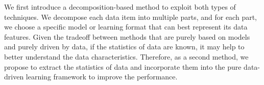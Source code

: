  
 



We first introduce a decomposition-based method to exploit both types of techniques.  We decompose each data item into multiple parts, and for each part, we choose a specific model or learning format that can best represent its data features. Given the tradeoff between methods that are purely based on models and purely driven by data, if the statistics of data are known, it may help to %
better understand the data characteristics. Therefore, as a second method, we propose to extract the statistics of data and incorporate them into the pure data-driven learning framework to improve the performance. 

